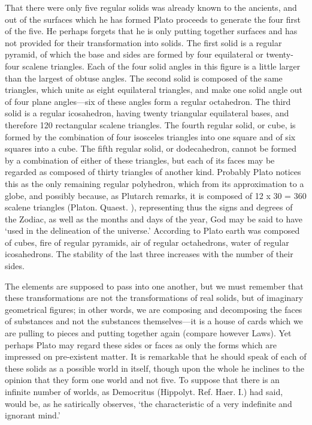 \documentclass[11pt,letter]{article}
\begin{document}
\par  That there were only five regular solids was already known to the ancients, and out of the surfaces which he has formed Plato proceeds to generate the four first of the five. He perhaps forgets that he is only putting together surfaces and has not provided for their transformation into solids. The first solid is a regular pyramid, of which the base and sides are formed by four equilateral or twenty-four scalene triangles. Each of the four solid angles in this figure is a little larger than the largest of obtuse angles. The second solid is composed of the same triangles, which unite as eight equilateral triangles, and make one solid angle out of four plane angles—six of these angles form a regular octahedron. The third solid is a regular icosahedron, having twenty triangular equilateral bases, and therefore 120 rectangular scalene triangles. The fourth regular solid, or cube, is formed by the combination of four isosceles triangles into one square and of six squares into a cube. The fifth regular solid, or dodecahedron, cannot be formed by a combination of either of these triangles, but each of its faces may be regarded as composed of thirty triangles of another kind. Probably Plato notices this as the only remaining regular polyhedron, which from its approximation to a globe, and possibly because, as Plutarch remarks, it is composed of 12 x 30 = 360 scalene triangles (Platon. Quaest. ), representing thus the signs and degrees of the Zodiac, as well as the months and days of the year, God may be said to have ‘used in the delineation of the universe.’ According to Plato earth was composed of cubes, fire of regular pyramids, air of regular octahedrons, water of regular icosahedrons. The stability of the last three increases with the number of their sides.

\par  The elements are supposed to pass into one another, but we must remember that these transformations are not the transformations of real solids, but of imaginary geometrical figures; in other words, we are composing and decomposing the faces of substances and not the substances themselves—it is a house of cards which we are pulling to pieces and putting together again (compare however Laws). Yet perhaps Plato may regard these sides or faces as only the forms which are impressed on pre-existent matter. It is remarkable that he should speak of each of these solids as a possible world in itself, though upon the whole he inclines to the opinion that they form one world and not five. To suppose that there is an infinite number of worlds, as Democritus (Hippolyt. Ref. Haer. I.) had said, would be, as he satirically observes, ‘the characteristic of a very indefinite and ignorant mind.’
\end{document}
